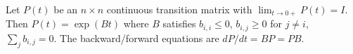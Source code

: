 Let $P(t)$ be an $n \times n$ continuous transition matrix with $\lim_{t \to 0+} P(t) = I$. Then $P(t) = \exp(Bt)$ where $B$ satisfies $b_{i,i} \leq 0$, $b_{i,j} \geq 0$ for $j \neq i$, $\sum_j b_{i,j} = 0$. The backward/forward equations are $dP/dt = BP = PB$.
